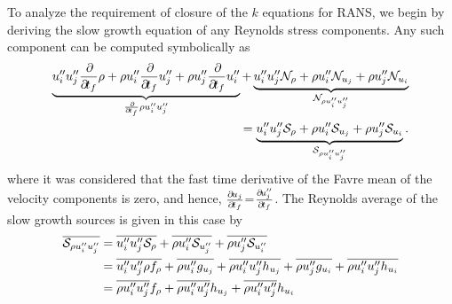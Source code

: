 {%

To analyze the requirement of closure of the $k$
equations for RANS, we begin by deriving the slow growth equation of any
Reynolds stress components. Any such component can be computed symbolically
as
%
\begin{equation}
\begin{split}
  \underbrace{\ffluc{u_i} \ffluc{u_j} \pp{}{t_f}\rho     + \rho \ffluc{u_i} \pp{}{t_f}\ffluc{u_j} + \rho \ffluc{u_j} \pp{}{t_f}\ffluc{u_i} }_{\pp{}{t_f}\rho \ffluc{u_i} \ffluc{u_j}}
+ \underbrace{\ffluc{u_i} \ffluc{u_j} \mathcal{N}_{\rho} + \rho \ffluc{u_i} \mathcal{N}_{u_j}     + \rho \ffluc{u_j} \mathcal{N}_{u_i}    }_{\mathcal{N}_{\rho \ffluc{u_i} \ffluc{u_j}} } \\
= \underbrace{\ffluc{u_i} \ffluc{u_j} \Ssd_{\rho}        + \rho \ffluc{u_i} \Ssd_{u_j}            + \rho \ffluc{u_j} \Ssd_{u_i}           }_{\Ssd_{\rho \ffluc{u_i} \ffluc{u_j}}}
.
\end{split}
\end{equation}
%
where it was considered that the fast time derivative of the Favre mean of the
velocity components is zero, and hence, $\frac{\partial\!{u_j}}{\partial\!{t_f}}$=$\frac{\partial\!{u_j''}}{\partial\!{t_f}}$.
The Reynolds average of the slow growth sources is given in this case by
%
\begin{align}
\overline{\mathcal{S}_{\rho u_i'' u_j''}}
&= \overline{u_i'' u_j'' \mathcal{S}_{\rho}}
 + \overline{\rho u_i'' \mathcal{S}_{u_j''}}
 + \overline{\rho u_j'' \mathcal{S}_{u_i''}} \notag \\
&= \overline{u_i'' u_j'' \rho  f_{\rho}}
 + \overline{\rho u_i'' g_{u_j}} + \overline{\rho u_i'' u_j'' h_{u_j}}
 + \overline{\rho u_j'' g_{u_i}} + \overline{\rho u_i'' u_j'' h_{u_i}} \notag \\
&= \overline{\rho u_i'' u_j''} f_{\rho}
 + \overline{\rho u_i'' u_j''} h_{u_j}
 + \overline{\rho u_i'' u_j''} h_{u_i}
\end{align}
%

}
